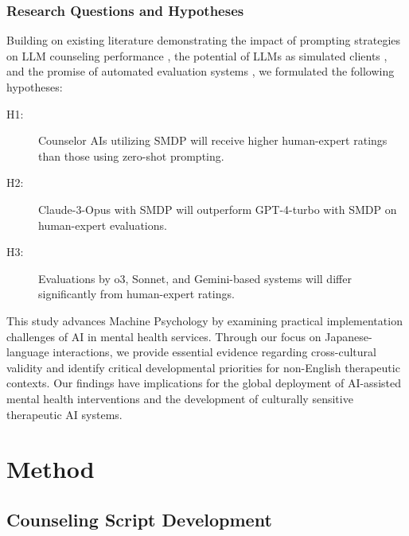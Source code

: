 \documentclass{wiley-article}
\begin{document}
\subsubsection*{Research Questions and Hypotheses}

Building on existing literature demonstrating the impact of prompting strategies on LLM counseling performance \citep{leeComparativeStudyPerformance2024,huangEmpowermentLargeLanguage2024}, the potential of LLMs as simulated clients \citep{potterEnhancingCommunicationClinical2024,grayIncreasingRealismVariety2024}, and the promise of automated evaluation systems \citep{rudolphAutomatedFeedbackGeneration2024,sharmaHumanAICollaboration2023}, we formulated the following hypotheses:

\begin{description}
  \item[H1:] Counselor AIs utilizing SMDP will receive higher human-expert ratings than those using zero-shot prompting.
  \item[H2:] Claude-3-Opus with SMDP will outperform GPT-4-turbo with SMDP on human-expert evaluations.
  \item[H3:] Evaluations by o3, Sonnet, and Gemini-based systems will differ significantly from human-expert ratings.
\end{description}

This study advances Machine Psychology by examining practical implementation challenges of AI in mental health services. Through our focus on Japanese-language interactions, we provide essential evidence regarding cross-cultural validity and identify critical developmental priorities for non-English therapeutic contexts. Our findings have implications for the global deployment of AI-assisted mental health interventions and the development of culturally sensitive therapeutic AI systems.





\section*{Method}

\subsection*{Counseling Script Development}
\end{document}
